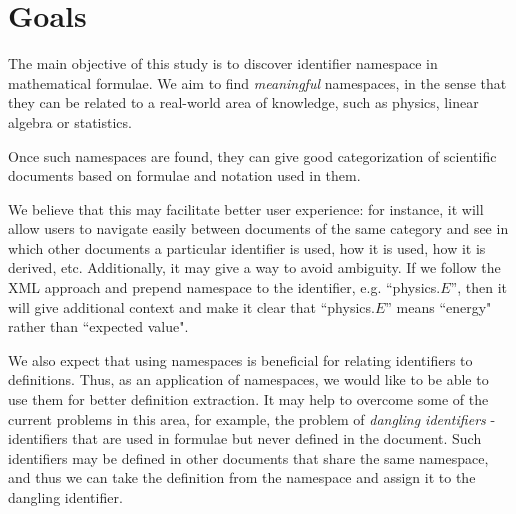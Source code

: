 \section{Goals}

The main objective of this study is to discover identifier namespace in mathematical formulae.
We aim to find \emph{meaningful} namespaces, in the sense that they can be related to a real-world area of knowledge, such as physics, linear algebra or statistics.

Once such namespaces are found, they can give good categorization of scientific documents based on formulae and notation used in them.

We believe that this may facilitate better user experience: for instance, it will allow users to navigate easily between documents of the same category and see in which other documents a particular identifier is used, how it is used, how it is derived, etc. Additionally, it may give a way to avoid ambiguity. If we follow the XML approach \cite{xmlnamespaces} and prepend namespace to the identifier, e.g. ``physics.$E$'', then it will give additional context and make it clear that ``physics.$E$'' means ``energy" rather than ``expected value".

We also expect that using namespaces is beneficial for relating identifiers to definitions. Thus, as an application of namespaces, we would like to be able to use them for better definition extraction. It may help to overcome some of the current problems in this area, for example, the problem of \emph{dangling identifiers} \cite{pagael2014mlp} - identifiers that are used in formulae but never defined in the document. Such identifiers may be defined in other documents that share the same namespace, and thus we can take the definition from the namespace and assign it to the dangling identifier.


